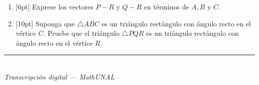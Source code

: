 \documentclass[11pt]{article}
\newcommand{\examfooter}{%
  \vfill
  \rule{\linewidth}{0.4pt}\\[1pt]
  {\scriptsize\textit{Transcripción digital --- MathUNAL}\hfill\textcolor{unalblue}{\textbf{\thepage}}}
}
\begin{document}
\begin{enumerate}
\begin{enumerate}[label=(\alph*)]
\item{}[6pt] Exprese los vectores $P-R$ y $Q-R$ en términos de $A,B$ y $C$.
\item{}[10pt] Suponga que $\triangle ABC$ es un triángulo rectángulo con ángulo recto en el vértice $C$. Pruebe que el triángulo $\triangle PQR$ es un triángulo rectángulo con ángulo recto en el vértice $R$.
\end{enumerate}

\end{enumerate}

\examfooter
\end{document}
